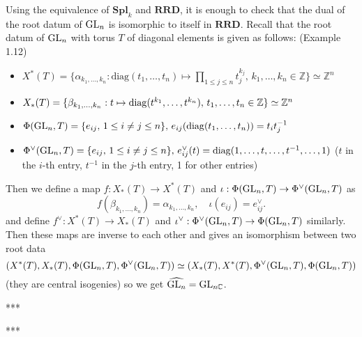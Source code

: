 \begin{problem}
Using the equivalence of $\mathbf{Spl}_{k}$ and $\mathbf{RRD}$, it is enough to check that the dual of the root datum
of $\operatorname{\mathrm{GL}}_{n}$ is isomorphic to itself in $\mathbf{RRD}$.
Recall that the root datum of $\operatorname{\mathrm{GL}}_{n}$ with torus $T$ of diagonal elements is given as follows: (Example 1.12)
\begin{itemize}
    \item $X^{*}(T) = \{
        \alpha_{k_1, \dots, k_{n}}: \mathrm{diag}(t_{1}, \dots, t_{n}) \mapsto \prod_{1\leq j \leq n}t_{j}^{k_{j}}, \, k_{1}, \dots, k_{n} \in \mathbb{Z}
    \}\simeq \mathbb{Z}^{n}$
    \item $X_{*}(T) = \{\beta_{k_{1}, \dots, k_{n}}:t \mapsto \operatorname{\mathrm{diag}}(t^{k_{1}}, \dots, t^{k_{n}}),\, t_{1}, \dots, t_{n} \in \mathbb{Z}\} \simeq \mathbb{Z}^{n}$
    \item $\Phi(\operatorname{\mathrm{GL}}_{n}, T) = \{e_{ij},\,1\leq i\neq j \leq n\},\,e_{ij}(\operatorname{\mathrm{diag}}(t_{1}, \dots, t_{n})) = t_{i}t_{j}^{-1}$
    \item $\Phi^{\vee}(\operatorname{\mathrm{GL}}_{n}, T) = \{e_{ij},\,1\leq i\neq j \leq n\},\,e_{ij}^{\vee}(t) = \operatorname{\mathrm{diag}}(1, \dots, t, \dots, t^{-1}, \dots, 1)$ ($t$ in the $i$-th entry, $t^{-1}$ in the $j$-th entry, 1 for other entries)
\end{itemize}
Then we define a map $f: X_{*}(T) \to X^{*}(T)$ and $\iota: \Phi(\operatorname{\mathrm{GL}}_{n}, T) \to \Phi^{\vee}(\operatorname{\mathrm{GL}}_{n}, T)$ as
$$
    f(\beta_{k_1, \dots, k_n}) = \alpha_{k_1, \dots, k_n}, \quad \iota(e_{ij}) = e_{ij}^{\vee}.
$$
and define $f^{\vee}: X^{*}(T) \to X_{*}(T)$ and $\iota^{\vee}: \Phi^{\vee}(\operatorname{\mathrm{GL}}_{n}, T) \to \Phi(\operatorname{\mathrm{GL}}_{n}, T)$ similarly.
Then these maps are inverse to each other and gives an isomorphism between two root data
$$
    (X^{*}(T), X_{*}(T), \Phi(\operatorname{\mathrm{GL}}_{n}, T), \Phi^{\vee}(\operatorname{\mathrm{GL}}_{n}, T)) \simeq (X_{*}(T), X^{*}(T), \Phi^{\vee}(\operatorname{\mathrm{GL}}_{n}, T), \Phi(\operatorname{\mathrm{GL}}_{n}, T))
$$
(they are central isogenies) so we get $\widehat{\operatorname{\mathrm{GL}}_{n}} = \operatorname{\mathrm{GL}}_{n\mathbb{C}}$.
\end{problem}

\begin{problem} ***
\end{problem}

\begin{problem} ***
\end{problem}
